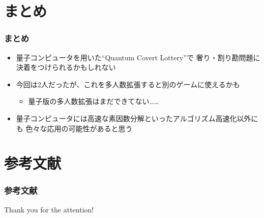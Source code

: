 \section{まとめ}

\begin{frame}
  \frametitle{まとめ}

  \pause
  \begin{itemize}
    \item<+-> 量子コンピュータを用いた``Quantum Covert Lottery''で
    奢り・割り勘問題に決着をつけられるかもしれない

    \item<+-> 今回は2人だったが、これを多人数拡張すると別のゲームに使えるかも
    \begin{itemize}
      \item 量子版の多人数拡張はまだできてない……
    \end{itemize}

    \item<+-> 量子コンピュータには高速な素因数分解といったアルゴリズム高速化以外にも
    色々な応用の可能性があると思う
  \end{itemize}
\end{frame}

\section*{参考文献}
\begin{frame}[allowframebreaks]
  \frametitle{参考文献}%

  \nocite{*}
  
  
\end{frame}

\begin{frame}
  \centering
  {\Huge Thank you for the attention!}
\end{frame}


